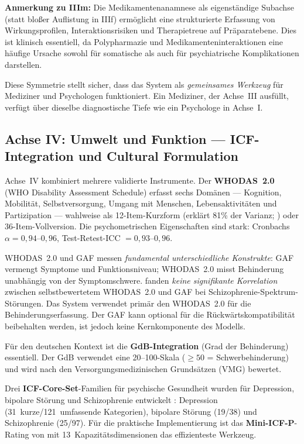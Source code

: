 \documentclass[11pt,a4paper]{article}
\begin{document}
\textbf{Anmerkung zu IIIm:} Die Medikamentenanamnese als eigenst\"andige Subachse (statt blo\ss{}er Auflistung in IIIf) erm\"oglicht eine strukturierte Erfassung von Wirkungsprofilen, Interaktionsrisiken und Therapietreue auf Pr\"aparatebene. Dies ist klinisch essentiell, da Polypharmazie und Medikamenteninteraktionen eine h\"aufige Ursache sowohl f\"ur somatische als auch f\"ur psychiatrische Komplikationen darstellen.

Diese Symmetrie stellt sicher, dass das System als \textit{gemeinsames Werkzeug} f\"ur Mediziner und Psychologen funktioniert. Ein Mediziner, der Achse~III ausf\"ullt, verf\"ugt \"uber dieselbe diagnostische Tiefe wie ein Psychologe in Achse~I.

\subsection{Achse IV: Umwelt und Funktion --- ICF-Integration und Cultural Formulation}
\label{sec:achse4}

Achse~IV kombiniert mehrere validierte Instrumente. Der \textbf{WHODAS~2.0} \citep{WHO2010} (WHO Disability Assessment Schedule) erfasst sechs Dom\"anen --- Kognition, Mobilit\"at, Selbstversorgung, Umgang mit Menschen, Lebensaktivit\"aten und Partizipation --- wahlweise als 12-Item-Kurzform (erkl\"art 81\% der Varianz; \citealp{Luciano2010}) oder 36-Item-Vollversion. Die psychometrischen Eigenschaften sind stark: Cronbachs $\alpha = 0{,}94$--$0{,}96$, Test-Retest-ICC $= 0{,}93$--$0{,}96$.

WHODAS~2.0 und GAF messen \textit{fundamental unterschiedliche Konstrukte}: GAF vermengt Symptome und Funktionsniveau; WHODAS~2.0 misst Behinderung unabh\"angig von der Symptomschwere. \citet{Gspandl2018} fanden \textit{keine signifikante Korrelation} zwischen selbstbewertetem WHODAS~2.0 und GAF bei Schizophrenie-Spektrum-St\"orungen. Das System verwendet prim\"ar den WHODAS~2.0 f\"ur die Behinderungserfassung. Der GAF kann optional f\"ur die R\"uckw\"artskompatibilit\"at beibehalten werden, ist jedoch keine Kernkomponente des Modells.

F\"ur den deutschen Kontext ist die \textbf{GdB-Integration} (Grad der Behinderung) essentiell. Der GdB verwendet eine 20--100-Skala ($\geq 50$ = Schwerbehinderung) und wird nach den Versorgungsmedizinischen Grunds\"atzen (VMG) bewertet.

Drei \textbf{ICF-Core-Set}-Familien f\"ur psychische Gesundheit wurden f\"ur Depression, bipolare St\"orung und Schizophrenie entwickelt \citep{Cieza2004Depression, AyusoMateos2013Bipolar, GomezBenito2018Schizophrenia}: Depression (31~kurze/121~umfassende Kategorien), bipolare St\"orung (19/38) und Schizophrenie (25/97). F\"ur die praktische Implementierung ist das \textbf{Mini-ICF-P}-Rating von \citet{LindenBaron2005} mit 13~Kapazit\"atsdimensionen das effizienteste Werkzeug.
\end{document}
